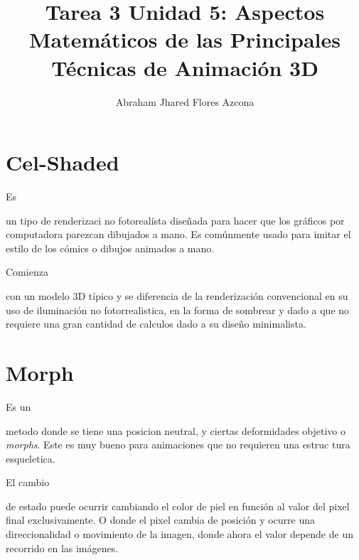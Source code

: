 \documentclass[stu, 12pt, letterpaper, donotrepeattitle, floatsintext, natbib]{apa7}
\title{\Large Tarea 3 Unidad 5: Aspectos Matemáticos de las Principales Técnicas de Animación 3D}
\author{Abraham Jhared Flores Azcona} %
\affiliation{Instituto Tecnológico de Tijuana}
\begin{document}
    \maketitle

    \newpage
    \section{Cel-Shaded}
    Es \begin{justifying}
      un tipo de renderizaci no fotorealísta diseñada para hacer que los gráficos por computadora parezcan dibujados a mano.
      Es comúnmente usado para imitar el estilo de los cómics o dibujos animados a mano. \citep{blanchard-2015}\par %
    \end{justifying}
    Comienza \begin{justifying}
      con un modelo 3D típico y se diferencia de la renderización convencional en su uso de iluminación no fotorrealistica, en la forma de sombrear
      y dado a que no requiere una gran cantidad de calculos dado a su diseño minimalista.\par
    \end{justifying}
    \vspace{\baselineskip}
    \section{Morph}
    Es un \begin{justifying}
      metodo donde se tiene una posicion neutral, y ciertas deformidades objetivo o \emph{morphs}. Este es muy bueno para animaciones
      que no requieren una estruc tura esqueletica.\par \citep{h-2018}%
    \end{justifying}
    El cambio \begin{justifying}
      de estado puede ocurrir cambiando el color de piel en función al valor del pixel final exclusivamente. O donde el pixel cambia de posición
      y ocurre una direccionalidad o movimiento de la imagen, donde ahora el valor depende de un recorrido en las imágenes.\par
    \end{justifying}
    \vspace{\baselineskip}
\end{document}
